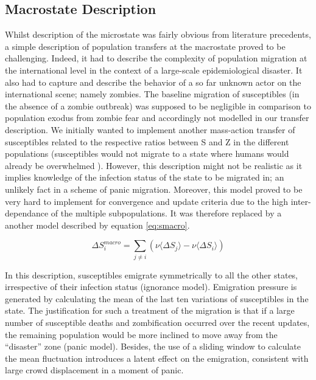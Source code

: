 \documentclass[11pt]{article} %
\begin{document}
\subsection{Macrostate Description}\indent

Whilst description of the microstate was fairly obvious from literature precedents, a simple description of population transfers at the macrostate proved to be challenging. Indeed, it had to describe the complexity of population migration at the international level in the context of a large-scale epidemiological disaster. It also had to capture and describe the behavior of a so far unknown actor on the international scene; namely zombies. The baseline migration of susceptibles (in the absence of a zombie outbreak) was supposed to be negligible in comparison to population exodus from zombie fear and accordingly not modelled in our transfer description. We initially wanted to implement another mass-action transfer of susceptibles related to the respective ratios between S and Z in the different populations (susceptibles would not migrate to a state where humans would already be overwhelmed ). However, this description might not be realistic as it implies knowledge of the infection status of the state to be migrated in; an unlikely fact in a scheme of panic migration. Moreover, this model proved to be very hard to implement for convergence and update criteria due to the high inter-dependance of the multiple subpopulations. It was therefore replaced by a another model described by equation \eqref{eq:smacro}. 

\bigskip
\begin{equation} \label{eq:smacro}
\Delta S_{i}^{macro} =  \sum_{j\neq i}{ \left( \nu \langle \Delta S_{j} \rangle - \nu  \langle \Delta S_{i} \rangle \right) }
\end{equation}
\bigskip

In this description, susceptibles emigrate symmetrically to all the other states, irrespective of their infection status (ignorance model). Emigration pressure is generated by calculating the mean of the last ten variations of susceptibles in the state. The justification for such a treatment of the migration is that if a large number of susceptible deaths and zombification occurred over the recent updates, the remaining population would be more inclined to move away from the ``disaster'' zone (panic model). Besides, the use of a sliding window to calculate the mean fluctuation introduces a latent effect on the emigration, consistent with large crowd displacement in a moment of panic. 
\end{document}

